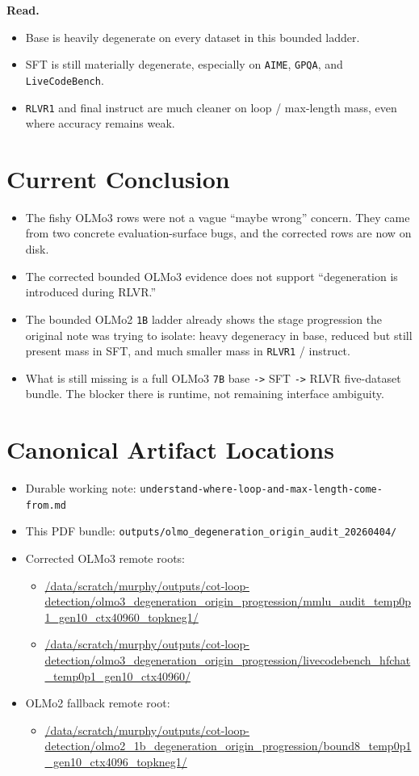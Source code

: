 \documentclass[11pt]{article}
\begin{document}
\textbf{Read.}
\begin{itemize}[leftmargin=1.5em]
\item Base is heavily degenerate on every dataset in this bounded ladder.
\item SFT is still materially degenerate, especially on \texttt{AIME}, \texttt{GPQA}, and \texttt{LiveCodeBench}.
\item \texttt{RLVR1} and final instruct are much cleaner on loop / max-length mass, even where accuracy remains weak.
\end{itemize}

\section*{Current Conclusion}
\begin{itemize}[leftmargin=1.5em]
\item The fishy OLMo3 rows were not a vague ``maybe wrong'' concern. They came from two concrete evaluation-surface bugs, and the corrected rows are now on disk.
\item The corrected bounded OLMo3 evidence does not support ``degeneration is introduced during RLVR.''
\item The bounded OLMo2 \texttt{1B} ladder already shows the stage progression the original note was trying to isolate: heavy degeneracy in base, reduced but still present mass in SFT, and much smaller mass in \texttt{RLVR1} / instruct.
\item What is still missing is a full OLMo3 \texttt{7B} base \texttt{->} SFT \texttt{->} RLVR five-dataset bundle. The blocker there is runtime, not remaining interface ambiguity.
\end{itemize}

\section*{Canonical Artifact Locations}
\begin{itemize}[leftmargin=1.5em]
\item Durable working note: \texttt{understand-where-loop-and-max-length-come-from.md}
\item This PDF bundle: \texttt{outputs/olmo\_degeneration\_origin\_audit\_20260404/}
\item Corrected OLMo3 remote roots:
  \begin{itemize}[leftmargin=1.5em]
  \item \url{/data/scratch/murphy/outputs/cot-loop-detection/olmo3_degeneration_origin_progression/mmlu_audit_temp0p1_gen10_ctx40960_topkneg1/}
  \item \url{/data/scratch/murphy/outputs/cot-loop-detection/olmo3_degeneration_origin_progression/livecodebench_hfchat_temp0p1_gen10_ctx40960/}
  \end{itemize}
\item OLMo2 fallback remote root:
  \begin{itemize}[leftmargin=1.5em]
  \item \url{/data/scratch/murphy/outputs/cot-loop-detection/olmo2_1b_degeneration_origin_progression/bound8_temp0p1_gen10_ctx4096_topkneg1/}
  \end{itemize}
\end{itemize}
\end{document}
